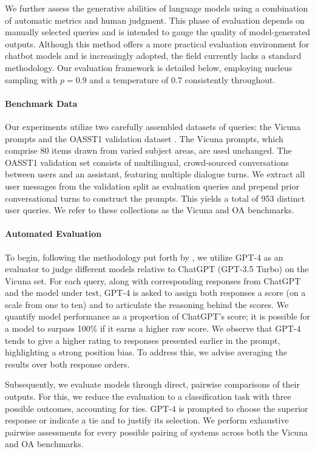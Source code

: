 We further assess the generative abilities of language models using a combination of automatic metrics and human judgment. This phase of evaluation depends on manually selected queries and is intended to gauge the quality of model-generated outputs. Although this method offers a more practical evaluation environment for chatbot models and is increasingly adopted, the field currently lacks a standard methodology. Our evaluation framework is detailed below, employing nucleus sampling with $p=0.9$ and a temperature of $0.7$ consistently throughout.

\paragraph{Benchmark Data} Our experiments utilize two carefully assembled datasets of queries: the Vicuna prompts \citep{vicuna2023} and the OASST1 validation dataset \citep{kopf2023openassistant}. The Vicuna prompts, which comprise 80 items drawn from varied subject areas, are used unchanged. The OASST1 validation set consists of multilingual, crowd-sourced conversations between users and an assistant, featuring multiple dialogue turns. We extract all user messages from the validation split as evaluation queries and prepend prior conversational turns to construct the prompts. This yields a total of 953 distinct user queries. We refer to these collections as the Vicuna and OA benchmarks.

\paragraph{Automated Evaluation} To begin, following the methodology put forth by \citet{vicuna2023}, we utilize GPT-4 as an evaluator to judge different models relative to ChatGPT (GPT-3.5 Turbo) on the Vicuna set. For each query, along with corresponding responses from ChatGPT and the model under test, GPT-4 is asked to assign both responses a score (on a scale from one to ten) and to articulate the reasoning behind the scores. We quantify model performance as a proportion of ChatGPT's score; it is possible for a model to surpass 100\% if it earns a higher raw score. We observe that GPT-4 tends to give a higher rating to responses presented earlier in the prompt, highlighting a strong position bias. To address this, we advise averaging the results over both response orders.

Subsequently, we evaluate models through direct, pairwise comparisons of their outputs. For this, we reduce the evaluation to a classification task with three possible outcomes, accounting for ties. GPT-4 is prompted to choose the superior response or indicate a tie and to justify its selection. We perform exhaustive pairwise assessments for every possible pairing of systems across both the Vicuna and OA benchmarks.

